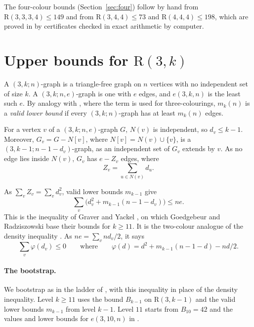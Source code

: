 \documentclass[11pt]{article}
\theoremstyle{spacedplain}
\theoremstyle{spaceddef}
\theoremstyle{spacedremark}
\newcommand{\R}{\mathrm{R}}
\begin{document}
The four-colour bounds (Section~\ref{sec:four}) follow by hand from $\R(3,3,3,4)\le 149$ \cite{Rad26} and from $\R(3,4,4)\le 73$ and $\R(4,4,4)\le 198$, which are proved in \cite[Theorems~8.3 and~8.2]{DC26} by certificates checked in exact arithmetic by computer.

\section{Upper bounds for \texorpdfstring{$\R(3,k)$}{R(3,k)}}\label{sec:r3k}

A $(3,k;n)$-graph is a triangle-free graph on $n$ vertices with no independent set of size $k$.
A $(3,k;n,e)$-graph is one with $e$ edges, and $e(3,k,n)$ is the least such $e$.
By analogy with \cite[Section~3]{DC26}, where the term is used for three-colourings, $m_k(n)$ is a \emph{valid lower bound} if every $(3,k;n)$-graph has at least $m_k(n)$ edges.

For a vertex $v$ of a $(3,k;n,e)$-graph $G$, $N(v)$ is independent, so $d_v\le k-1$.
Moreover, $G_v=G-N[v]$, where $N[v]=N(v)\cup\{v\}$, is a $(3,k-1;n-1-d_v)$-graph, as an independent set of $G_v$ extends by $v$.
As no edge lies inside $N(v)$, $G_v$ has $e-Z_v$ edges, where
\[
Z_v=\sum_{u\in N(v)}d_u .
\]

As $\sum_vZ_v=\sum_vd_v^2$, valid lower bounds $m_{k-1}$ give
\[
\sum_v\big(d_v^2+m_{k-1}(n-1-d_v)\big)\le ne .
\]
This is the inequality of Graver and Yackel \cite{GrY}, on which Goedgebeur and Radziszowski \cite{GR13} base their bounds for $k\ge 11$.
It is the two-colour analogue of the density inequality \cite[Lemma~3.3]{DC26}.
As $ne=\sum_vnd_v/2$, it says
\[
\sum_v\varphi(d_v)\le 0 \qquad\text{where}\qquad \varphi(d)=d^2+m_{k-1}(n-1-d)-nd/2 .
\]

\paragraph{The bootstrap.}
We bootstrap as in the ladder of \cite[Section~5]{DC26}, with this inequality in place of the density inequality.
Level $k\ge 11$ uses the bound $B_{k-1}$ on $\R(3,k-1)$ and the valid lower bounds $m_{k-1}$ from level $k-1$.
Level $11$ starts from $B_{10}=42$ \cite[Theorem~6]{GR13} and the values and lower bounds for $e(3,10,n)$ in \cite{GR13}.
\end{document}
